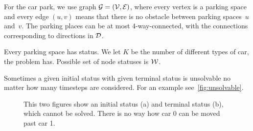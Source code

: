 For the car park, we use graph $\mathcal{G} = (\mathcal{V},\mathcal{E})$, where every vertex is a
parking space and every edge $(u,v)$ means that there is no obstacle between
parking spaces~$u$ and~$v$. The parking places can be at most 4-way-connected,
with the connections corresponding to directions in $\mathcal{D}$.

Every parking space has status. We let $K$ be the number of different types of
car, the problem has. Possible set of node statuses is $\mathcal{W}$.

Sometimes a given initial status with given terminal status is unsolvable no
matter how many timesteps are considered. For an example
see~\autoref{fig:unsolvable}.

\begin{figure}[h]
    \begin{center}
        \caption{This two figures show an initial status (a) and terminal
            status (b), which cannot be solved. There is no way how car 0 can be
        moved past car 1.}
        \label{fig:unsolvable}
    \end{center}
\end{figure}
